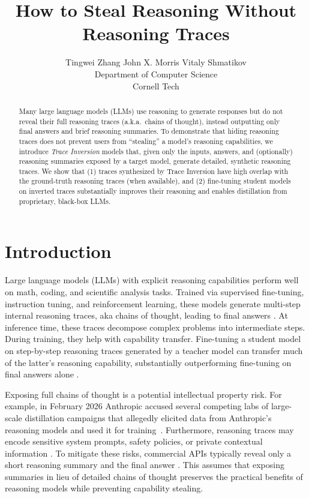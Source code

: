 \documentclass{article}
\title{How to Steal Reasoning Without Reasoning Traces}
\author{%
  Tingwei Zhang \quad John X. Morris \quad Vitaly Shmatikov \\
  Department of Computer Science\\
  Cornell Tech
}
\begin{document}
\maketitle


\begin{abstract}
  Many large language models (LLMs) use reasoning to generate responses but do not reveal their full reasoning traces (a.k.a.\ chains of thought), instead outputting only final answers and brief reasoning summaries.  To demonstrate that hiding reasoning traces does not prevent users from ``stealing'' a model's reasoning capabilities, we introduce \emph{Trace Inversion} models that, given only the inputs, answers, and (optionally) reasoning summaries exposed by a target model, generate detailed, synthetic reasoning traces.  We show that (1) traces synthesized by Trace Inversion have high overlap with the ground-truth reasoning traces (when available), and (2) fine-tuning student models on inverted traces substantially improves their reasoning and enables distillation from proprietary, black-box LLMs.  
\end{abstract}


\section{Introduction}
\label{sec:intro}
Large language models (LLMs) with explicit reasoning capabilities perform well on math, coding, and scientific analysis tasks.  Trained via supervised fine-tuning, instruction tuning, and reinforcement learning, these models generate multi-step internal reasoning traces, aka chains of thought, leading to final answers \citep{wei2022chain, ouyang2022training, chen2025skip}. 
At inference time, these traces decompose complex problems into intermediate steps.  During training, they help with capability transfer.  Fine-tuning a student model on step-by-step reasoning traces generated by a teacher model can transfer much of the latter's reasoning capability, substantially outperforming fine-tuning on final answers alone \citep{hinton2015distilling, gou2021knowledge, shridhar2023distilling, chen2025skip}. 

Exposing full chains of thought is a potential intellectual property risk.  For example, in February 2026 Anthropic accused several competing labs of large-scale distillation campaigns that allegedly elicited data from Anthropic's reasoning models and used it for training~\citep{anthropic_distillation_2026}.  Furthermore, reasoning traces may encode sensitive system prompts, safety policies, or private contextual information \citep{green2025leaky, deepseek_exploit, zhou2025hidden}.
To mitigate these risks,  commercial APIs typically reveal only a short reasoning summary and the final answer \citep{openai_reasoning_docs, gemini_thoughts_docs, anthropic_extended_thinking}.  This assumes that exposing summaries in lieu of detailed chains of thought preserves the practical benefits of reasoning models while preventing capability stealing.  
\end{document}
